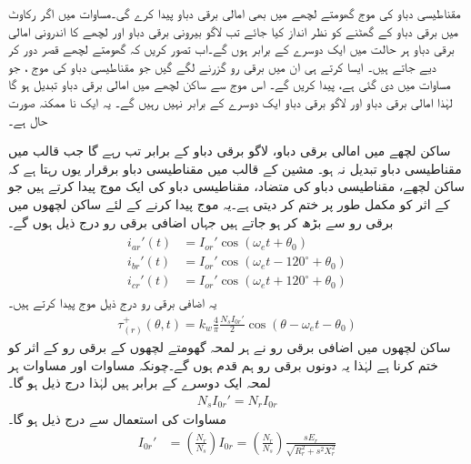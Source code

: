 مقناطیسی دباو کی موج  گھومتے لچھے میں بھی امالی برقی دباو پیدا کرے گی۔مساوات   میں  اگر رکاوٹ میں برقی دباو کے گھٹنے کو نظر انداز کیا جائے تب لاگو بیرونی برقی دباو اور لچھے کا اندرونی امالی برقی دباو ہر حالت میں ایک دوسرے کے برابر ہوں گے۔اب تصور کریں کہ گھومتے لچھے قصر دور کر دیے جاتے ہیں۔ ایسا کرتے ہی ان میں برقی رو گزرنے لگے گیں جو مقناطیسی دباو کی موج  ، جو مساوات   میں دی گئی ہے،  پیدا کریں گے۔ اس موج سے ساکن لچھے میں امالی برقی دباو  تبدیل ہو  گا لہٰذا امالی برقی دباو اور  لاگو برقی دباو ایک دوسرے کے برابر نہیں رہیں گے۔ یہ ایک نا ممکنہ صورت حال ہے۔

ساکن لچھے میں امالی برقی دباو،  لاگو برقی دباو کے برابر تب رہے گا جب قالب میں مقناطیسی دباو تبدیل نہ ہو۔ مشین کے قالب میں مقناطیسی دباو برقرار یوں رہتا ہے کہ ساکن لچھے،  مقناطیسی دباو   کی متضاد، مقناطیسی دباو کی ایک موج پیدا کرتے ہیں جو  کے اثر کو مکمل طور پر ختم کر دیتی ہے۔یہ موج پیدا کرنے کے لئے ساکن لچھوں میں برقی رو  سے بڑھ کر  ہو جاتے ہیں جہاں اضافی برقی رو درج ذیل ہوں  گے۔
\begin{gather}
\begin{aligned}\label{مساوات_امالی_تین_رو_الف}
i_{ar}'(t)&=I_{or}' \cos (\omega_e t+\theta_0)\\
i_{br}'(t)&=I_{or}' \cos (\omega_e t-120^{\circ}+\theta_0)\\
i_{cr}'(t)&=I_{or}' \cos (\omega_e t+120^{\circ}+\theta_0)
\end{aligned}
\end{gather}
یہ اضافی برقی رو درج ذیل موج پیدا کرتے ہیں۔
\begin{align}\label{مساوات_امالی_اضافی_موج}
\tau_{(r)}^+(\theta,t)=k_w \frac{4}{\pi}\frac{N_s I_{0r}'}{2} \cos (\theta-\omega_e t -\theta_0)
\end{align}
ساکن لچھوں میں اضافی برقی رو نے ہر لمحہ گھومتے لچھوں کے برقی رو کے اثر کو ختم کرنا ہے لہٰذا یہ دونوں برقی رو ہم قدم  ہوں گے۔چونکہ  مساوات  اور مساوات  ہر لمحہ ایک دوسرے کے  برابر ہیں لہٰذا درج ذیل ہو گا۔
\begin{align}
N_s I_{0r}'=N_r I_{0r}
\end{align}
مساوات  کی استعمال سے  درج ذیل ہو گا۔
\begin{align}\label{مساوات_امالی_گھومتے_لچھے_کا_ساکن_پر_رو_اثر}
I_{0r}'&=\left(\frac{N_r}{N_s}\right) I_{0r}=\left(\frac{N_r}{N_s}\right) \frac{s E_r}{\sqrt{R_r^2+s^2 X_r^2}}
\end{align}
